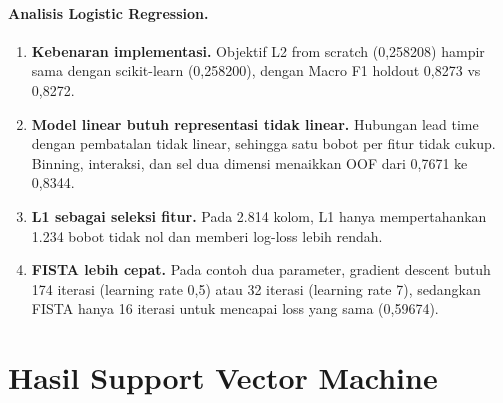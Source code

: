 \paragraph{Analisis Logistic Regression.}
\begin{enumerate}
  \item \textbf{Kebenaran implementasi.} Objektif L2 from scratch (0,258208) hampir sama dengan scikit-learn (0,258200), dengan Macro F1 holdout 0,8273 vs 0,8272.
  \item \textbf{Model linear butuh representasi tidak linear.} Hubungan lead time dengan pembatalan tidak linear, sehingga satu bobot per fitur tidak cukup. Binning, interaksi, dan sel dua dimensi menaikkan OOF dari 0,7671 ke 0,8344.
  \item \textbf{L1 sebagai seleksi fitur.} Pada 2.814 kolom, L1 hanya mempertahankan 1.234 bobot tidak nol dan memberi log-loss lebih rendah.
  \item \textbf{FISTA lebih cepat.} Pada contoh dua parameter, gradient descent butuh 174 iterasi (learning rate 0,5) atau 32 iterasi (learning rate 7), sedangkan FISTA hanya 16 iterasi untuk mencapai loss yang sama (0,59674).
\end{enumerate}

\section{Hasil Support Vector Machine}
\begingroup
\setlength{\emergencystretch}{3em}
